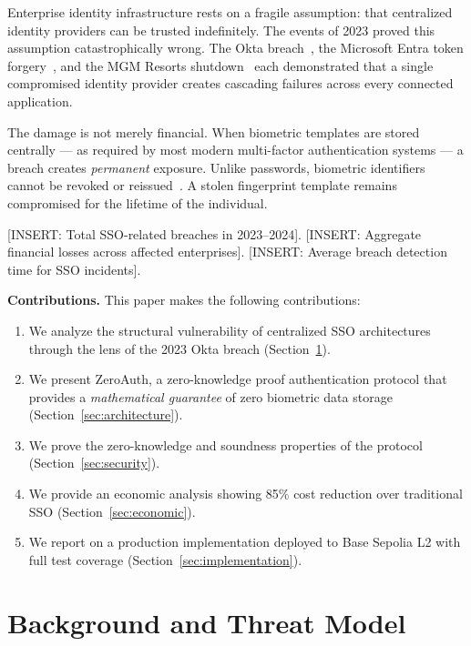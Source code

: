 \documentclass[journal, letterpaper, 10pt]{IEEEtran}
\newcommand{\placeholder}[1]{\textsf{\small\color{red!70!black}[#1]}}
\begin{document}
Enterprise identity infrastructure rests on a fragile assumption: that centralized identity providers can be trusted indefinitely. The events of 2023 proved this assumption catastrophically wrong. The Okta breach~\cite{okta2023}, the Microsoft Entra token forgery~\cite{microsoft2023}, and the MGM Resorts shutdown~\cite{mgm2023} each demonstrated that a single compromised identity provider creates cascading failures across every connected application.

The damage is not merely financial. When biometric templates are stored centrally --- as required by most modern multi-factor authentication systems --- a breach creates \emph{permanent} exposure. Unlike passwords, biometric identifiers cannot be revoked or reissued~\cite{nist80063b}. A stolen fingerprint template remains compromised for the lifetime of the individual.

\placeholder{INSERT: Total SSO-related breaches in 2023--2024}. \placeholder{INSERT: Aggregate financial losses across affected enterprises}. \placeholder{INSERT: Average breach detection time for SSO incidents}.

\textbf{Contributions.} This paper makes the following contributions:
\begin{enumerate}
  \item We analyze the structural vulnerability of centralized SSO architectures through the lens of the 2023 Okta breach (Section~\ref{sec:background}).
  \item We present ZeroAuth, a zero-knowledge proof authentication protocol that provides a \emph{mathematical guarantee} of zero biometric data storage (Section~\ref{sec:architecture}).
  \item We prove the zero-knowledge and soundness properties of the protocol (Section~\ref{sec:security}).
  \item We provide an economic analysis showing 85\% cost reduction over traditional SSO (Section~\ref{sec:economic}).
  \item We report on a production implementation deployed to Base Sepolia L2 with full test coverage (Section~\ref{sec:implementation}).
\end{enumerate}

\section{Background and Threat Model}
\label{sec:background}
\end{document}
